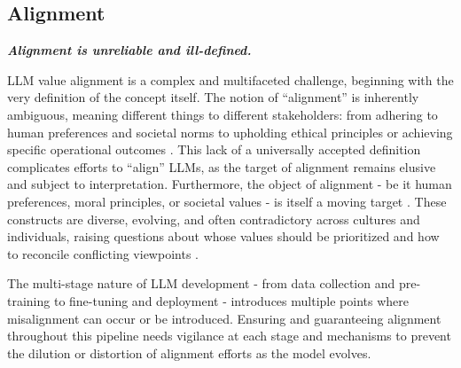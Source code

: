 \subsection{Alignment}
\noindent\textbf{\textit{Alignment is unreliable and ill-defined.}}
\newline 

\noindent LLM value alignment is a complex and multifaceted challenge, beginning with the very definition of the concept itself. The notion of ``alignment'' is inherently ambiguous, meaning different things to different stakeholders: from adhering to human preferences and societal norms to upholding ethical principles or achieving specific operational outcomes \citep{hendrycks_aligning_2020,gabriel2020artificial,kasirzadeh2023conversation,kirk2023empty,anwar2024foundational}. This lack of a universally accepted definition complicates efforts to ``align'' LLMs, as the target of alignment remains elusive and subject to interpretation. Furthermore, the object of alignment - be it human preferences, moral principles, or societal values - is itself a moving target \citep{anwar2024foundational}. These constructs are diverse, evolving, and often contradictory across cultures and individuals, raising questions about whose values should be prioritized and how to reconcile conflicting viewpoints \citep{askell2021general,sorensen2024roadmap,pistilli2024civics}. 

The multi-stage nature of LLM development - from data collection and pre-training to fine-tuning and deployment - introduces multiple points where misalignment can occur or be introduced. Ensuring and guaranteeing alignment throughout this pipeline needs vigilance at each stage and mechanisms to prevent the dilution or distortion of alignment efforts as the model evolves. 


